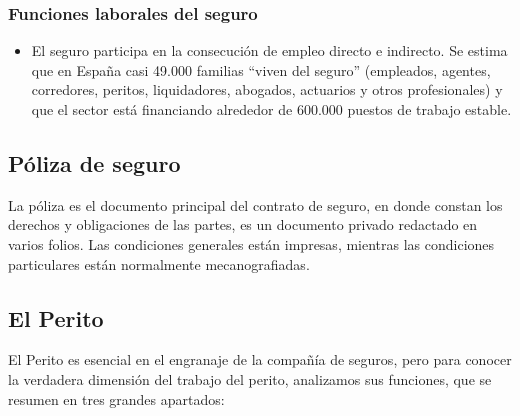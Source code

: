 \subsubsection{Funciones laborales del seguro}

\begin{itemize}

	\item El seguro participa en la consecución de empleo directo e indirecto. Se estima que en España casi 49.000 familias “viven del seguro” (empleados, agentes, corredores, peritos, liquidadores, abogados, actuarios y otros profesionales) y que el sector está financiando alrededor de 600.000 puestos de trabajo estable.

\end{itemize}

\subsection{Póliza de seguro}
\setlength{\parskip}{5mm}

	La póliza es el documento principal del contrato de seguro, en donde constan los derechos y obligaciones de las partes, es un documento privado redactado en varios folios. Las condiciones generales están impresas, mientras las condiciones particulares están normalmente mecanografiadas. 


\setlength{\parskip}{0mm}

\subsection{El Perito}
\setlength{\parskip}{5mm}
	El Perito es esencial en el engranaje de la compañía de seguros, pero para conocer la verdadera dimensión del trabajo del perito, analizamos sus funciones, que se resumen en tres grandes apartados:



